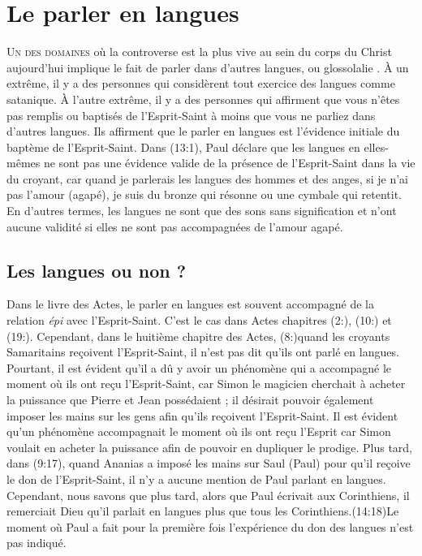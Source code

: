 \chapter{Le parler en langues}

\begin{specialpar}{}
\lettrine{U}{n des domaines} où la controverse est la plus vive au sein
 du corps du Christ aujourd'hui implique le fait de parler dans d'autres
 langues, ou \og glossolalie \fg{}.
 À un extrême, il y a des personnes qui considèrent tout exercice
 des langues comme satanique.
 À l'autre extrême, il y a des personnes qui affirment que vous n'êtes pas
 remplis ou baptisés de l'Esprit-Saint à moins que vous ne parliez
 dans d'autres langues. Ils affirment que le parler en langues
 est l'évidence initiale du baptème de l'Esprit-Saint.
 Dans (13:1), Paul déclare que les langues en elles-mêmes
 ne sont pas une évidence valide de la présence de l'Esprit-Saint dans la vie
 du croyant, car \og quand je parlerais les langues des hommes et des anges,
 si je n'ai pas l'amour (agapé), je suis du bronze qui résonne ou une cymbale
 qui retentit. \fg{}
 En d'autres termes, les langues ne sont que des sons sans signification
 et n'ont aucune validité si elles ne sont pas accompagnées de l'amour agapé.
\end{specialpar}


\section*{Les langues ou non ?}

Dans le livre des Actes, le parler en langues est souvent accompagné
 de la relation \emph{épi} avec l'Esprit-Saint.
 C'est le cas dans Actes chapitres (2:), (10:)
 et (19:). Cependant, dans le huitième chapitre des Actes, (8:)quand les croyants Samaritains reçoivent
 l'Esprit-Saint, il n'est pas dit qu'ils ont parlé en langues.
 Pourtant, il est évident qu'il a dû y avoir un phénomène qui a accompagné
 le moment où ils ont reçu l'Esprit-Saint, car Simon le magicien cherchait
 à acheter la puissance que Pierre et Jean possédaient ;
 il désirait pouvoir également imposer les mains sur les gens
 afin qu'ils reçoivent l'Esprit-Saint. Il est évident qu'un phénomène
 accompagnait le moment où ils ont reçu l'Esprit car Simon voulait en acheter
 la puissance afin de pouvoir en dupliquer le prodige.
 Plus tard, dans (9:17), quand Ananias a imposé les mains
 sur Saul (Paul) pour qu'il reçoive le don de l'Esprit-Saint,
 il n'y a aucune mention de Paul parlant en langues.
 Cependant, nous savons que plus tard, alors que Paul écrivait aux
 Corinthiens, il remerciait Dieu qu'il parlait en langues plus que tous
 les Corinthiens.(14:18)Le moment où Paul a fait pour la première fois
 l'expérience du don des langues n'est pas indiqué.


